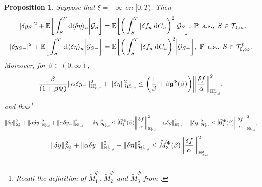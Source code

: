 \documentclass[10pt]{article} %
\newtheorem{proposition}[theorem]{Proposition}
\newcommand\cG{\mathcal G}
\newcommand\cH{\mathcal H}
\newcommand\cS{\mathcal S}
\newcommand\cT{\mathcal T}
\newcommand{\smalltext}[1]{\text{\fontsize{4}{4}\selectfont$#1$}}
\newcommand\fg{\mathfrak g}
\def \E{\mathbb{E}}
\def \H{\mathbb{H}}
\def \P{\mathbb{P}}
\newcommand{\1}{\mathbf{1}}
\def\d{\mathrm{d}}
\begin{document}
\begin{proposition}\label{prop::apriori_bsde}
	Suppose that $\xi = -\infty$ on $[0,T)$. Then
	\begin{align*}
		|\delta y_S|^2 +\E\bigg[\int_S^T \d \langle\delta\eta\rangle_u \bigg| \cG_S\bigg] &= \E\bigg[\bigg(\int_S^T |\delta f_u| \d C_u\bigg)^2\bigg| \cG_S\bigg], \; \text{$\P$\rm--a.s.}, \; S \in \cT_{0,\infty},\\
		|\delta y_{S-}|^2 +\E\bigg[\int_{S-}^T \d \langle\delta\eta\rangle_u \bigg| \cG_{S-}\bigg] &= \E\bigg[\bigg(\int_{S-}^T |\delta f_u| \d C_u\bigg)^2\bigg| \cG_{S-}\bigg], \; \text{$\P$\rm--a.s.}, \; S \in \cT^p_{0,\infty}.
	\end{align*}
	Moreover, for $\beta \in (0,\infty)$,
	\begin{equation*}
		\frac{\beta}{(1+\beta\Phi)}\|\alpha\delta y_{-}\|^2_{\H^\smalltext{2}_{\smalltext{T}\smalltext{,}\smalltext{\beta}}} + \|\delta\eta\|^2_{\cH^\smalltext{2}_{\smalltext{T}\smalltext{,}\smalltext{\beta}}} 
		\leq \bigg(\frac{1}{\beta} + \beta \fg^\Phi(\beta)\bigg) \bigg\|\frac{\delta f}{\alpha}\bigg\|^2_{\H^\smalltext{2}_{\smalltext{T}\smalltext{,}\smalltext{\beta}}},
	\end{equation*}
	and thus\footnote{Recall the definition of $\widetilde M^\Phi_1$, $\widetilde M^\Phi_2$ and $\widetilde M^\Phi_3$ from .}
	\begin{equation*}
		\|\delta y\|^2_{\cS^\smalltext{2}_\smalltext{T}} + \|\alpha\delta y\|^2_{\H^\smalltext{2}_{\smalltext{T}\smalltext{,}\smalltext{\beta}}} + \|\alpha\delta y_{-}\|^2_{\H^\smalltext{2}_{\smalltext{T}\smalltext{,}\smalltext{\beta}}} + \|\delta\eta\|^2_{\cH^\smalltext{2}_{\smalltext{T}\smalltext{,}\smalltext{\beta}}} 
		\leq \widetilde M^\Phi_1(\beta) \bigg\|\frac{\delta f}{\alpha}\bigg\|^2_{\H^\smalltext{2}_{\smalltext{T}\smalltext{,}\smalltext{\beta}}},
		\;
		\|\alpha\delta y\|^2_{\H^\smalltext{2}_{\smalltext{T}\smalltext{,}\smalltext{\beta}}} + \|\delta\eta\|^2_{\cH^\smalltext{2}_{\smalltext{T}\smalltext{,}\smalltext{\beta}}} 
		\leq \widetilde M^\Phi_2(\beta) \bigg\|\frac{\delta f}{\alpha}\bigg\|^2_{\H^\smalltext{2}_{\smalltext{T}\smalltext{,}\smalltext{\beta}}},
	\end{equation*}
	\begin{equation*}
		\|\delta y\|^2_{\cS^\smalltext{2}_\smalltext{T}} + \|\alpha\delta y_{-}\|^2_{\H^\smalltext{2}_{\smalltext{T}\smalltext{,}\smalltext{\beta}}} + \|\delta\eta\|^2_{\cH^\smalltext{2}_{\smalltext{T}\smalltext{,}\smalltext{\beta}}} 
		\leq \widetilde M^\Phi_3(\beta) \bigg\|\frac{\delta f}{\alpha}\bigg\|^2_{\H^\smalltext{2}_{\smalltext{T}\smalltext{,}\smalltext{\beta}}}.
	\end{equation*}
\end{proposition}
\end{document}
